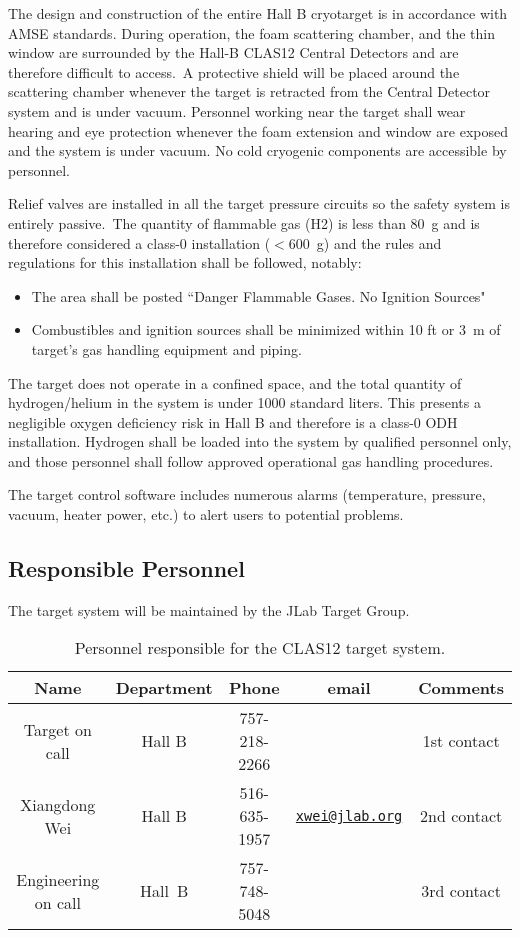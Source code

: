 The design and construction of the entire Hall B cryotarget is in accordance with AMSE standards. During operation,
the foam scattering chamber, and the thin window are surrounded by the Hall-B CLAS12 Central Detectors and are
therefore difficult to access.~A protective shield will be placed around the scattering chamber whenever the target
is retracted from the Central Detector system and is under vacuum.  Personnel working near the target shall wear
hearing and eye protection whenever the foam extension and window are exposed and the system is under vacuum. No
cold cryogenic components are accessible by personnel.

Relief valves are installed in all the target pressure circuits so the safety system is entirely passive.~The quantity
of flammable gas (H2) is less than 80~g and is therefore considered a class-0 installation ($<$600~g) and the rules and
regulations for this installation shall be followed, notably:

\begin{itemize}
\item The area shall be posted ``Danger Flammable Gases. No Ignition Sources" 
\item Combustibles and ignition sources shall be minimized within 10 ft or 3~m of target’s gas handling equipment and
  piping.
\end{itemize}

The target does not operate in a confined space, and the total quantity of hydrogen/helium in the system is under 1000
standard liters. This presents a negligible oxygen deficiency risk in Hall B and therefore is a class-0 ODH installation.
Hydrogen shall be loaded into the system by qualified personnel only, and those personnel shall follow approved operational
gas handling procedures.

The target control software includes numerous alarms (temperature, pressure, vacuum, heater power, etc.) to alert users
to potential problems.

\subsection{Responsible Personnel}

The target system will be maintained by the JLab Target Group.  

\begin{table}[!htb]
\centering
\begin{tabular}{|c|c|c|c|c|}
\hline
Name & Department & Phone & email & Comments \\ \hline
Target on call & Hall B & 757-218-2266 & & 1st contact \\ \hline
Xiangdong Wei  & Hall B & 516-635-1957 & \href{mailto:xwei@jlab.org}{\nolinkurl{xwei@jlab.org}} & 2nd contact \\ \hline
Engineering on call & Hall~B&757-748-5048&& 3rd contact  \\ \hline
\end{tabular}
\caption{Personnel responsible for the CLAS12 target system.} 
\label{tb:target}
\end{table}
